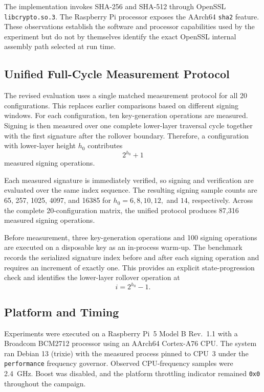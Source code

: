 \documentclass[pdflatex,sn-mathphys-num]{sn-jnl}
\begin{document}
The implementation invokes SHA-256 and SHA-512 through OpenSSL
\texttt{libcrypto.so.3}. The Raspberry Pi processor exposes the
AArch64 \texttt{sha2} feature. These observations establish the
software and processor capabilities used by the experiment but do not
by themselves identify the exact OpenSSL internal assembly path selected
at run time.

\subsection{Unified Full-Cycle Measurement Protocol}
\label{sec:fullcycle_protocol}

The revised evaluation uses a single matched measurement protocol for
all 20 configurations. This replaces earlier comparisons based on
different signing windows. For each configuration, ten key-generation
operations are measured. Signing is then measured over one complete
lower-layer traversal cycle together with the first signature after the
rollover boundary. Therefore, a configuration with lower-layer height
$h_0$ contributes
\[
2^{h_0}+1
\]
measured signing operations.

Each measured signature is immediately verified, so signing and
verification are evaluated over the same index sequence. The resulting
signing sample counts are 65, 257, 1025, 4097, and 16385 for
$h_0=6,8,10,12,$ and $14$, respectively. Across the complete
20-configuration matrix, the unified protocol produces 87,316 measured
signing operations.

Before measurement, three key-generation operations and 100 signing
operations are executed on a disposable key as an in-process warm-up.
The benchmark records the serialized signature index before and after
each signing operation and requires an increment of exactly one. This
provides an explicit state-progression check and identifies the
lower-layer rollover operation at
\[
i=2^{h_0}-1.
\]

\subsection{Platform and Timing}
\label{sec:platform}

Experiments were executed on a Raspberry Pi~5 Model B Rev.~1.1 with a
Broadcom BCM2712 processor using an AArch64 Cortex-A76 CPU. The system
ran Debian 13 (trixie) with the measured process pinned to CPU~3 under
the \texttt{performance} frequency governor. Observed CPU-frequency
samples were 2.4~GHz. Boost was disabled, and the platform throttling
indicator remained \texttt{0x0} throughout the campaign.
\end{document}
